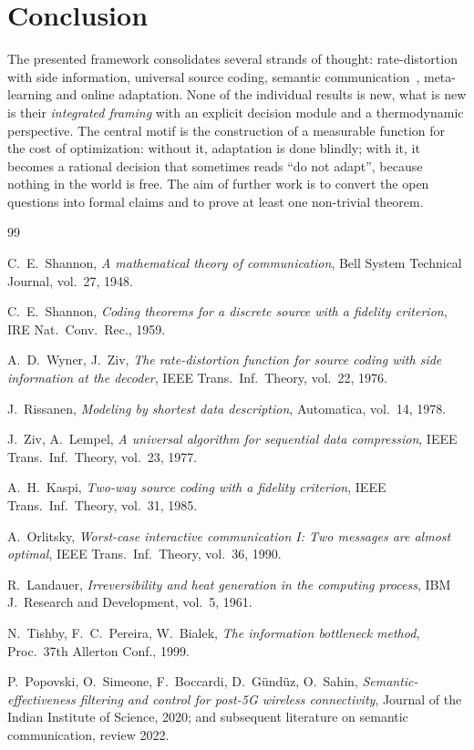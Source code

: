 \documentclass[11pt,a4paper]{article}
\begin{document}
\section{Conclusion}

The presented framework consolidates several strands of thought:
rate-distortion with side information, universal source coding,
semantic communication~\cite{popovski2022}, meta-learning and online
adaptation. None of the individual results is new, what is new is
their \emph{integrated framing} with an explicit decision module and
a thermodynamic perspective. The central motif is the construction of
a measurable function for the cost of optimization: without it,
adaptation is done blindly; with it, it becomes a rational decision
that sometimes reads ``do not adapt'', because nothing in the world
is free. The aim of further work is to convert the open questions
into formal claims and to prove at least one non-trivial theorem.


\begin{thebibliography}{99}

C.~E.~Shannon, \emph{A mathematical theory of communication},
Bell System Technical Journal, vol.~27, 1948.

C.~E.~Shannon, \emph{Coding theorems for a discrete source with
a fidelity criterion}, IRE Nat.\ Conv.\ Rec., 1959.

A.~D.~Wyner, J.~Ziv, \emph{The rate-distortion function for source
coding with side information at the decoder}, IEEE Trans.\ Inf.\ Theory,
vol.~22, 1976.

J.~Rissanen, \emph{Modeling by shortest data description},
Automatica, vol.~14, 1978.

J.~Ziv, A.~Lempel, \emph{A universal algorithm for sequential data
compression}, IEEE Trans.\ Inf.\ Theory, vol.~23, 1977.

A.~H.~Kaspi, \emph{Two-way source coding with a fidelity criterion},
IEEE Trans.\ Inf.\ Theory, vol.~31, 1985.

A.~Orlitsky, \emph{Worst-case interactive communication I: Two
messages are almost optimal}, IEEE Trans.\ Inf.\ Theory, vol.~36, 1990.

R.~Landauer, \emph{Irreversibility and heat generation in the
computing process}, IBM J.\ Research and Development, vol.~5, 1961.

N.~Tishby, F.~C.~Pereira, W.~Bialek, \emph{The information bottleneck
method}, Proc.\ 37th Allerton Conf., 1999.

P.~Popovski, O.~Simeone, F.~Boccardi, D.~Gündüz, O.~Sahin,
\emph{Semantic-effectiveness filtering and control for post-5G
wireless connectivity}, Journal of the Indian Institute of Science,
2020; and subsequent literature on semantic communication, review
2022.

\end{thebibliography}
\end{document}
